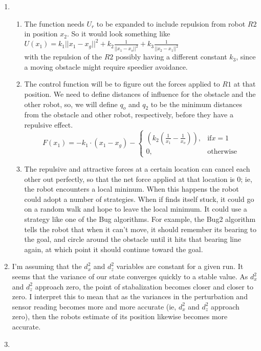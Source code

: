 \documentclass[letter,8pt]{article}
\begin{document}
\begin{enumerate}
\item
  \begin{enumerate}[label=\alph*)]
    \item The function needs $U_r$ to be expanded to include repulsion from robot $R2$ in position $x_2$. So it would look something like\\
      $U(x_1) = k_1||x_1 - x_g||^2 + k_2\frac{1}{||x_1 - x_o||^2} + k_3\frac{1}{||x_2 - x_1||^2}$\\
      with the repulsion of the $R2$ possibly having a different constant $k_3$, since a moving obstacle might require speedier avoidance.

    \item The control function will be to figure out the forces applied to $R1$ at that position. 
      We need to define distances of influence for the obstacle and the other robot, so, we will define $q_o$ and $q_2$
      to be the minimum distances from the obstacle and other robot, respectively, before they have a repulsive effect.
      \[
      F(x_1) = -k_1 \cdot ( x_1 - x_g) -
      \begin{cases}
        (k_2(\frac{1}{x_1} - \frac{1}{x_o})), & \text{if} x=1 \\
        0, & \text{otherwise}
       \end{cases}
      \]
    \item The repulsive and attractive forces at a certain location can cancel each other out perfectly, so that 
      the net force applied at that location is $0$; ie, the robot encounters a local mininum.
      When this happens the robot could adopt a number of strategies. When if finds itself stuck, it could go on a 
      random walk and hope to leave the local minimum. It could use a strategy like one of the Bug algorithms. 
      For example, the Bug2 algorithm tells the robot that when it can't move, it should remember its bearing
      to the goal, and circle around the obstacle until it hits that bearing line again, at which point it should
      continue toward the goal.
  \end{enumerate}
  
\item I'm assuming that the $d_x^2$ and $d_z^2$ variables are constant for a given run.
  It seems that the variance of our state converges quickly to a stable value. As $d_x^2$ and $d_z^2$
  approach zero, the point of stabalization becomes closer and closer to zero. I interpret this to mean
  that as the variances in the perturbation and sensor reading becomes more and more accurate (ie, $d_x^2$ and $d_z^2$ approach zero),
  then the robots estimate of its position likewise becomes more accurate.

\item 

\end{enumerate}
\end{document}
